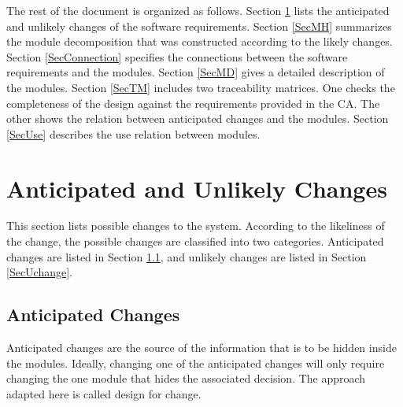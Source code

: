 \documentclass[12pt, titlepage]{article}
\begin{document}
The rest of the document is organized as follows. Section
\ref{SecChange} lists the anticipated and unlikely changes of the software
requirements. Section \ref{SecMH} summarizes the module decomposition that
was constructed according to the likely changes. Section \ref{SecConnection}
specifies the connections between the software requirements and the
modules. Section \ref{SecMD} gives a detailed description of the
modules. Section \ref{SecTM} includes two traceability matrices. One checks
the completeness of the design against the requirements provided in the CA. The
other shows the relation between anticipated changes and the modules. Section
\ref{SecUse} describes the use relation between modules.

\section{Anticipated and Unlikely Changes} \label{SecChange}

This section lists possible changes to the system. According to the likeliness
of the change, the possible changes are classified into two
categories. Anticipated changes are listed in Section \ref{SecAchange}, and
unlikely changes are listed in Section \ref{SecUchange}.

\subsection{Anticipated Changes} \label{SecAchange}

Anticipated changes are the source of the information that is to be hidden
inside the modules. Ideally, changing one of the anticipated changes will only
require changing the one module that hides the associated decision. The approach
adapted here is called design for
change.
\end{document}
